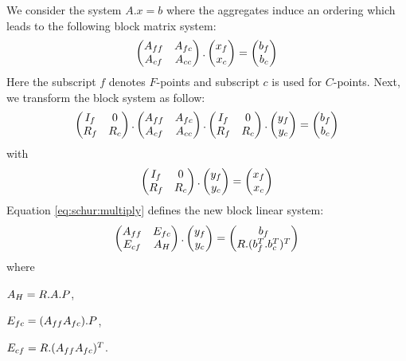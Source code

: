 We consider the system $A.x=b$ where the aggregates induce an ordering which leads to the following block matrix system:
\begin{equation} %
\begin{pmatrix}
\Aff & \Afc \\
\Acf & \Acc \\
\end{pmatrix} .
\vect{x} = \vect{b}
\end{equation}
%
Here the subscript $f$ denotes $F$-points and subscript $c$ is used for $C$-points. Next, we transform the block system as follow:
%
\begin{equation} \label{eq:schur:multiply}
\begin{pmatrix}
I_f & 0 \\
R_f & R_c \\
\end{pmatrix} .
\begin{pmatrix}
A_{ff} & A_{fc} \\
A_{cf} & A_{cc} \\
\end{pmatrix} .
\begin{pmatrix}
I_f & 0 \\
R_f & R_c \\
\end{pmatrix} .
\begin{pmatrix} y_f \\ y_c \\ \end{pmatrix} = \begin{pmatrix} b_f \\ b_c \\ \end{pmatrix}
\end{equation}
%
with
%
\begin{equation} %
\begin{pmatrix}
I_f & 0 \\
R_f & R_c \\
\end{pmatrix} .
\vect{y} = \vect{x}
\end{equation}
%
Equation \eqref{eq:schur:multiply} defines the new block linear system:
\begin{equation} \label{eq:schur:new}
\begin{pmatrix}
A_{ff} & E_{fc} \\
E_{cf} & A_{H } \\
\end{pmatrix} .
\begin{pmatrix} y_f \\ y_c \\ \end{pmatrix} = 
\begin{pmatrix}
b_f \\
R.(b_f^T.b_c^T)^T \\
\end{pmatrix}
\end{equation}
%
where 
\begin{myitem}
\item $A_{H } = R.A.P$,
\item $E_{fc} = (A_{ff} A_{fc}).P$,
\item $E_{cf} = R.(A_{ff} A_{fc})^T$.
\end{myitem}


